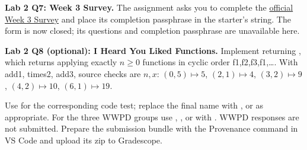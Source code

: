 \begin{prob}
\textbf{Lab 2 Q7: Week 3 Survey.} The assignment asks you to complete the \href{https://forms.gle/nbhRwerW4MQEWWDB8}{official Week 3 Survey} and place its completion passphrase in the starter's  string. The form is now closed; its questions and completion passphrase are unavailable here.\par
{}
\end{prob}
\begin{prob}
\textbf{Lab 2 Q8 (optional): I Heard You Liked Functions.} Implement  returning , which returns  applying exactly $n\ge0$ functions in cyclic order f1,f2,f3,f1,\ldots. With add1, times2, add3, source checks are $n,x$: $(0,5)\mapsto5$, $(2,1)\mapsto4$, $(3,2)\mapsto9$, $(4,2)\mapsto10$, $(6,1)\mapsto19$.\par
{}
\end{prob}

Use  for the corresponding code test; replace the final name with ,  or  as appropriate. For the three WWPD groups use , , or  with . WWPD responses are not submitted. Prepare the submission bundle with the Provenance command in VS Code and upload its zip to Gradescope.

